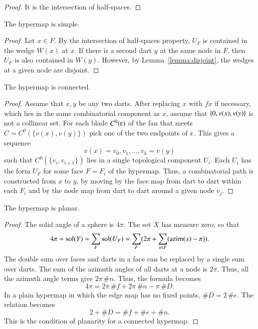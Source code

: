\begin{proof} It is the intersection of half-spaces.
\end{proof}

\begin{corollary}  
The hypermap is simple.
\end{corollary}

\begin{proof}  Let $x\in F$.  By the intersection of half-spaces property, $U_F$ is contained in the wedge $W(x)$ at $x$.  If there is a second dart $y$ at the same node in $F$, then $U_F$ is also contained in $W(y)$. However, by Lemma~\ref{lemma:disjoint}, the wedges at a given node are disjoint.
\end{proof}

\begin{corollary}  
The hypermap is connected.
\end{corollary}

\begin{proof} Assume that $x,y$ be any two darts.  After replacing $x$ with $f x$ if necessary, which lies in the same combinatorial component as $x$, 
assume that $\{0,v(x),v(y)\}$ is not a collinear set. 
For each blade $C^0(\e)$ of the fan that meets $C=C^0(\{v(x),v(y)\})$
pick one of the two endpoints of $\e$.  This gives a sequence
$$
v(x)=v_0,v_1,\ldots,v_k=v(y)
$$
such that $C^0(\{v_i,v_{i+1}\})$ lies in a single topological component $U_i$.  Each $U_i$ has the form $U_F$ for some face $F=F_i$ of the hypermap.
Thus,  a combinatorial path is constructed from $x$ to $y$, by moving by the face map from dart to dart within each $F_i$ and by the node map from dart to dart around a given node $v_j$.
\end{proof}

\begin{corollary}  
The hypermap is planar.
\end{corollary}

\begin{proof}  The solid angle of a sphere is $4\pi$.  The set $X$
has measure zero, so that
$$
4\pi = \operatorname{sol}(Y)= \sum_F \operatorname{sol}(U_F) = 
\sum_F ( 2\pi + \sum_{x\in F} ({\operatorname{azim}}(x)-\pi) ).
$$
The double sum over faces and darts in a face can be replaced by
a single sum over darts.  
The sum of the azimuth angles of all darts at a node is $2\pi$. Thus,
all the azimuth angle terms give $2\pi\,\#n$.
Thus, the formula becomes
$$
4\pi = 2\pi\, \#f +2\pi\,\#n - \pi\, \#D.
$$
In a plain hypermap in which the edge map has no fixed points, $\#D = 2\,\#e$.
The relation becomes
$$
2 + \#D = \#f + \#e + \#n.
$$
This is the condition of planarity for a connected hypermap.
\end{proof}

